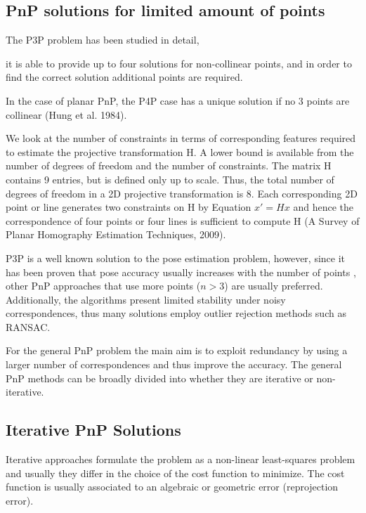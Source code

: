 \documentclass[letterpaper, 10 pt, conference]{ieeeconf}  %
\begin{document}
\subsection{PnP solutions for limited amount of points}
The P3P problem has been studied in detail,


it is able to provide up to four solutions for non-collinear points, and in order to find the correct solution additional points are required.


In the case of planar PnP, the P4P case has a unique solution if no 3 points are collinear (Hung et al. 1984). 

We look at the number of constraints in terms of
corresponding features required to estimate the
projective transformation H.  A lower bound
is available from the number of degrees
of freedom and the number of constraints.
The matrix H contains 9 entries, but
is defined only up to scale.
Thus, the total number of degrees of freedom
in a 2D projective transformation is 8.
Each corresponding 2D point or line
generates two constraints on H
by Equation $x' = Hx$ and hence
the correspondence of four points
or four lines is sufficient to compute H (A Survey of Planar
Homography Estimation Techniques, 2009). 

P3P is a well known solution to the pose estimation problem, however, since it has been proven that pose accuracy usually increases with the number of points \cite{Marchand2016}, other PnP approaches that use more points ($n > 3$) are usually preferred. Additionally, the algorithms  present limited stability under noisy correspondences, thus many solutions employ outlier rejection methods such as RANSAC. 

For the general PnP problem the main aim is to exploit redundancy by using a larger number of correspondences and thus improve the accuracy. The general PnP methods can be broadly divided into whether they are iterative or non-iterative.

\subsection{Iterative PnP Solutions}

Iterative approaches formulate the problem as a non-linear least-squares problem and usually they differ in the choice of the cost function to minimize. The cost function is usually associated to an algebraic or geometric error (reprojection error). 
\end{document}
